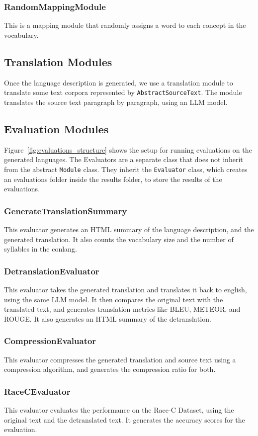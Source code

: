 \subsubsection{RandomMappingModule}
This is a mapping module that randomly assigns a word to each concept in the vocabulary.

\subsection{Translation Modules}
Once the language description is generated, we use a translation module to translate some text corpora represented by \texttt{AbstractSourceText}.
The module translates the source text paragraph by paragraph, using an LLM model.

\subsection{Evaluation Modules}
Figure~\ref{fig:evaluations_structure} shows the setup for running evaluations on the generated languages. The Evaluators are a separate class 
that does not inherit from the abstract \texttt{Module} class. They inherit the \texttt{Evaluator} class, which creates an evaluations folder 
inside the results folder, to store the results of the evaluations. 

\subsubsection{GenerateTranslationSummary}
This evaluator generates an HTML summary of the language description, and the generated translation. It also counts the vocabulary size and
the number of syllables in the conlang.
\subsubsection{DetranslationEvaluator}
This evaluator takes the generated translation and translates it back to english, using the same LLM model. It then compares the original text with the translated text,
and generates translation metrics like BLEU, METEOR, and ROUGE. It also generates an HTML summary of the detranslation.
\subsubsection{CompressionEvaluator}
This evaluator compresses the generated translation and source text using a compression algorithm, and generates the compression ratio for both.
\subsubsection{RaceCEvaluator}
This evaluator evaluates the performance on the Race-C Dataset, using the original text and the detranslated text. It generates the accuracy scores for the 
evaluation.
